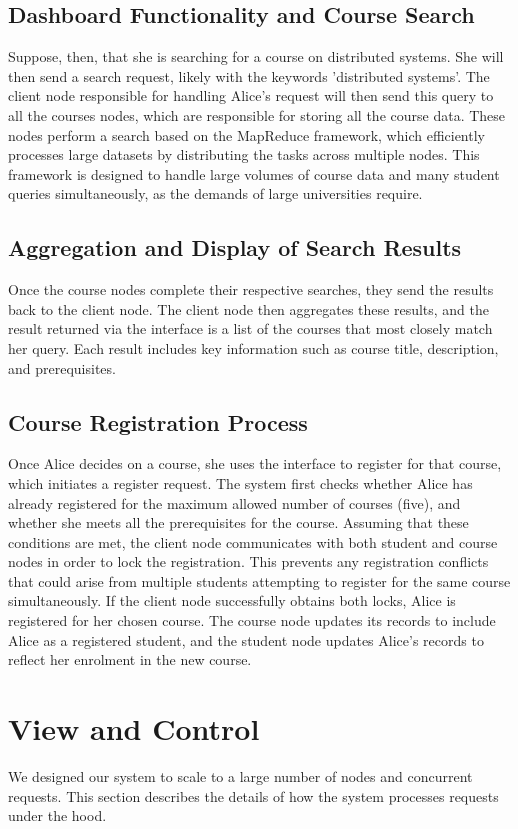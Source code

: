 \documentclass[sigplan, screen, 10pt]{acmart}
\begin{document}
\subsection{Dashboard Functionality and Course Search}
Suppose, then, that she is searching for a course on distributed systems. She will then send a search request, likely with the keywords 'distributed systems'. The client node responsible for handling Alice's request will then send this query to all the courses nodes, which are responsible for storing all the course data. These nodes perform a search based on the MapReduce \cite{mapreduce} framework, which efficiently processes large datasets by distributing the tasks across multiple nodes. This framework is designed to handle large volumes of course data and many student queries simultaneously, as the demands of large universities require.

\subsection{Aggregation and Display of Search Results}
Once the course nodes complete their respective searches, they send the results back to the client node. The client node then aggregates these results, and the result returned via the interface is a list of the courses that most closely match her query. Each result includes key information such as course title, description, and prerequisites.

\subsection{Course Registration Process}
Once Alice decides on a course, she uses the interface to register for that course, which initiates a register request. The system first checks whether Alice has already registered for the maximum allowed number of courses (five), and whether she meets all the prerequisites for the course. Assuming that these conditions are met, the client node communicates with both student and course nodes in order to lock the registration. This prevents any registration conflicts that could arise from multiple students attempting to register for the same course simultaneously. If the client node successfully obtains both locks, Alice is registered for her chosen course. The course node updates its records to include Alice as a registered student, and the student node updates Alice's records to reflect her enrolment in the new course.

\section{View and Control}
We designed our system to scale to a large number of nodes and concurrent requests. This section describes the details of how the system processes requests under the hood.
\end{document}
